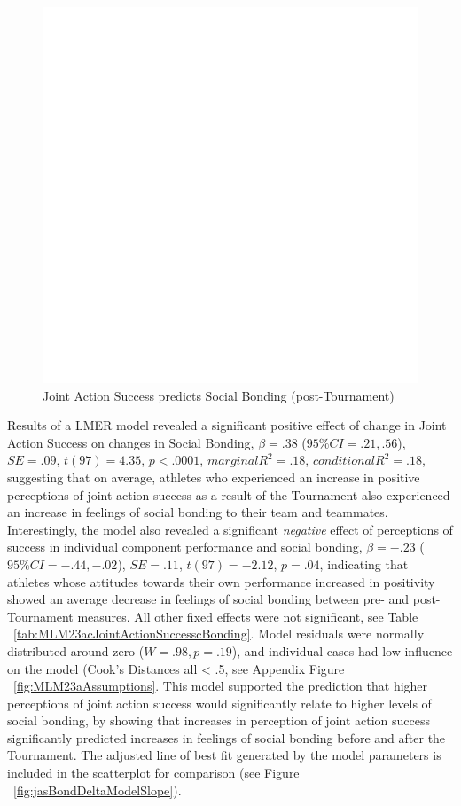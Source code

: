 \begin{figure}[htbp]
  \centering
\includegraphics[scale=.5]{images/jasBondDeltaBasicXY.pdf}
  \caption{Joint Action Success predicts Social Bonding (post-Tournament)}
  \label{fig:jasBondDeltaBasicXY}
\end{figure}


Results of a LMER model revealed a significant positive effect of change in Joint Action Success on changes in Social Bonding, $\beta = .38$ ($95\% CI =  .21, .56$), $SE = .09$, $t(97) = 4.35$, $p < .0001$, $marginal R^2 = .18$, $conditional R^2 = .18$, suggesting that on average, athletes who experienced an increase in positive perceptions of joint-action success as a result of the Tournament also experienced an increase in feelings of social bonding to their team and teammates.  Interestingly, the model also revealed a significant \textit{negative} effect of perceptions of success in individual component performance and social bonding, $\beta = -.23$ ($95\% CI =  -.44, -.02$), $SE = .11$, $t(97) = -2.12$, $p = .04$, indicating that athletes whose attitudes towards their own performance increased in positivity showed an average decrease in feelings of social bonding between pre- and post-Tournament measures. All other fixed effects were not significant, see Table ~\ref{tab:MLM23acJointActionSuccesscBonding}. Model residuals were normally distributed around zero ($W = .98, p = .19$), and individual cases had low influence on the model (Cook's Distances all < .5, see Appendix Figure ~\ref{fig:MLM23aAssumptions}.  This model supported the prediction that higher perceptions of joint action success would significantly relate to higher levels of social bonding, by showing that increases in perception of joint action success significantly predicted increases in feelings of social bonding before and after the Tournament.  The adjusted line of best fit generated by the model parameters is included in the scatterplot for comparison (see Figure ~\ref{fig:jasBondDeltaModelSlope}).

